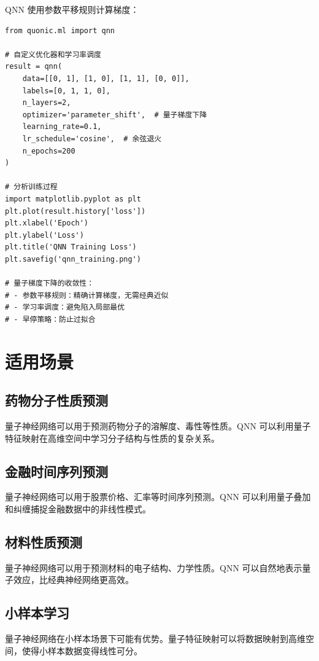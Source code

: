 \documentclass[12pt,a4paper]{article}
\begin{document}
QNN 使用参数平移规则计算梯度：

\begin{verbatim}
from quonic.ml import qnn

# 自定义优化器和学习率调度
result = qnn(
    data=[[0, 1], [1, 0], [1, 1], [0, 0]],
    labels=[0, 1, 1, 0],
    n_layers=2,
    optimizer='parameter_shift',  # 量子梯度下降
    learning_rate=0.1,
    lr_schedule='cosine',  # 余弦退火
    n_epochs=200
)

# 分析训练过程
import matplotlib.pyplot as plt
plt.plot(result.history['loss'])
plt.xlabel('Epoch')
plt.ylabel('Loss')
plt.title('QNN Training Loss')
plt.savefig('qnn_training.png')

# 量子梯度下降的收敛性：
# - 参数平移规则：精确计算梯度，无需经典近似
# - 学习率调度：避免陷入局部最优
# - 早停策略：防止过拟合
\end{verbatim}

\section{适用场景}

\subsection{药物分子性质预测}

量子神经网络可以用于预测药物分子的溶解度、毒性等性质。QNN 可以利用量子特征映射在高维空间中学习分子结构与性质的复杂关系。

\subsection{金融时间序列预测}

量子神经网络可以用于股票价格、汇率等时间序列预测。QNN 可以利用量子叠加和纠缠捕捉金融数据中的非线性模式。

\subsection{材料性质预测}

量子神经网络可以用于预测材料的电子结构、力学性质。QNN 可以自然地表示量子效应，比经典神经网络更高效。

\subsection{小样本学习}

量子神经网络在小样本场景下可能有优势。量子特征映射可以将数据映射到高维空间，使得小样本数据变得线性可分。
\end{document}
